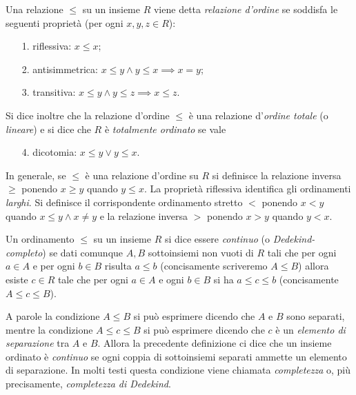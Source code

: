 \begin{definition}
  \label{def:ordine}%
  Una relazione
  $\le$ su un insieme $R$ viene detta
  \emph{relazione d'ordine}%
%
  se soddisfa le seguenti proprietà (per ogni $x,y,z\in R$):
  \begin{enumerate}
    \item[1.] riflessiva: $x\le x$;
    \item[2.] antisimmetrica: $x\le y \land y\le x \implies x=y$;
    \item[3.] transitiva: $x\le y \land y\le z \implies x\le z$.
  \end{enumerate}
  Si dice inoltre che la relazione d'ordine $\le$
  è una relazione d'\emph{ordine totale}
%
  (o \emph{lineare}) 
  e si dice che $R$ è \emph{totalmente ordinato} se vale
  \begin{enumerate}
    \item[4.] dicotomia: $x\le y \lor y\le x$.
  \end{enumerate}
\end{definition}

In generale, se $\le$ è una relazione d'ordine su $R$ si definisce la 
relazione inversa $\ge$ ponendo $x\ge y$ quando $y\le x$.
La proprietà riflessiva identifica gli ordinamenti \emph{larghi}.
Si definisce il corrispondente ordinamento stretto $<$
ponendo $x < y$ quando $x\le y \land x\neq y$
e la relazione inversa $>$ ponendo $x>y$ quando $y<x$.

\begin{definition}
  \label{def:ordinamento_continuo}%
  Un ordinamento $\le$ su un insieme $R$ si dice essere
  \emph{continuo}%
%
  (o \emph{Dedekind-completo})
  se dati comunque $A,B$ sottoinsiemi non vuoti di $R$
    tali che per ogni $a\in A$ e per ogni $b\in B$ risulta $a\le b$
    (concisamente scriveremo $A\le B$)
    allora esiste $c\in R$ tale che per ogni $a\in A$ e ogni $b\in B$ 
    si ha $a\le c \le b$ (concisamente $A\le c \le B$).
\end{definition}

A parole la condizione $A\le B$ 
si può esprimere dicendo che $A$ e $B$ sono separati, 
mentre la condizione $A\le c \le B$ 
si può esprimere dicendo che $c$ è un \emph{elemento di separazione}
tra $A$ e $B$. 
Allora la precedente definizione ci dice che un insieme ordinato
è \emph{continuo} se ogni coppia di sottoinsiemi separati 
ammette un elemento di separazione.
In molti testi questa condizione viene chiamata \emph{completezza}
o, più precisamente, \emph{completezza di Dedekind}.
%
%

